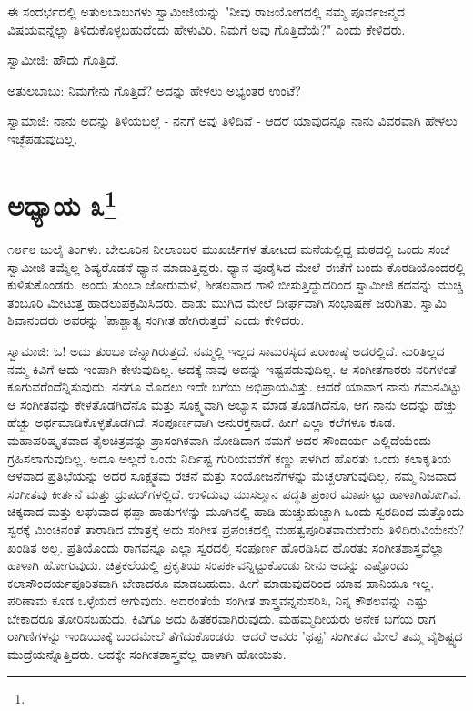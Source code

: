 ಈ ಸಂದರ್ಭದಲ್ಲಿ ಅತುಲಬಾಬುಗಳು ಸ್ವಾಮೀಜಿಯನ್ನು "ನೀವು ರಾಜಯೋಗದಲ್ಲಿ ನಮ್ಮ ಪೂರ್ವಜನ್ಮದ ವಿಷಯವನ್ನೆಲ್ಲಾ ತಿಳಿದುಕೊಳ್ಳಬಹುದೆಂದು ಹೇಳುವಿರಿ. ನಿಮಗೆ ಅವು ಗೊತ್ತಿದೆಯೆ?" ಎಂದು ಕೇಳಿದರು.

ಸ್ವಾಮೀಜಿ: ಹೌದು ಗೊತ್ತಿದೆ.

ಅತುಲಬಾಬು: ನಿಮಗೇನು ಗೊತ್ತಿದೆ? ಅದನ್ನು ಹೇಳಲು ಅಭ್ಯಂತರ ಉಂಟೆ?

ಸ್ವಾಮಾಜಿ: ನಾನು ಅದನ್ನು ತಿಳಿಯಬಲ್ಲೆ - ನನಗೆ ಅವು ತಿಳಿದಿವೆ - ಆದರೆ ಯಾವುದನ್ನೂ ನಾನು ವಿವರವಾಗಿ ಹೇಳಲು ಇಚ್ಛೆಪಡುವುದಿಲ್ಲ.

\newpage

\chapter[ಅಧ್ಯಾಯ ೩]{ಅಧ್ಯಾಯ ೩\protect\footnote{}}

೧೮೯೮ ಜುಲೈ ತಿಂಗಳು. ಬೇಲೂರಿನ ನೀಲಾಂಬರ ಮುಖರ್ಜಿಗಳ ತೋಟದ ಮನೆಯಲ್ಲಿದ್ದ ಮಠದಲ್ಲಿ ಒಂದು ಸಂಜೆ ಸ್ವಾಮೀಜಿ ತಮ್ಮೆಲ್ಲ ಶಿಷ್ಯರೊಡನೆ ಧ್ಯಾನ ಮಾಡುತ್ತಿದ್ದರು. ಧ್ಯಾನ ಪೂರೈಸಿದ ಮೇಲೆ ಈಚೆಗೆ ಬಂದು ಕೊಠಡಿಯೊಂದರಲ್ಲಿ ಕುಳಿತುಕೊಂಡರು. ಅಂದು ತುಂಬಾ ಜೋರುಮಳೆ, ಶೀತಲವಾದ ಗಾಳಿ ಬೀಸುತ್ತಿದ್ದುದರಿಂದ ಸ್ವಾಮೀಜಿ ಕದವನ್ನು ಮುಚ್ಚಿ ತಂಬೂರಿ ಮೀಟುತ್ತ ಹಾಡಲುಪಕ್ರಮಿಸಿದರು. ಹಾಡು ಮುಗಿದ ಮೇಲೆ ದೀರ್ಘವಾಗಿ ಸಂಭಾಷಣೆ ಜರುಗಿತು. ಸ್ವಾಮಿ ಶಿವಾನಂದರು ಅವರನ್ನು 'ಪಾಶ್ಚಾತ್ಯ ಸಂಗೀತ ಹೇಗಿರುತ್ತದೆ' ಎಂದು ಕೇಳಿದರು.

ಸ್ವಾಮಾಜಿ: ಓ! ಅದು ತುಂಬಾ ಚೆನ್ನಾಗಿರುತ್ತದೆ. ನಮ್ಮಲ್ಲಿ ಇಲ್ಲದ ಸಾಮರಸ್ಯದ ಪರಾಕಾಷ್ಠೆ ಅದರಲ್ಲಿದೆ. ನುರಿತಿಲ್ಲದ ನಮ್ಮ ಕಿವಿಗೆ ಅದು ಇಂಪಾಗಿ ಕೇಳುವುದಿಲ್ಲ. ಅದಕ್ಕೆ ನಾವು ಅದನ್ನು ಇಷ್ಟಪಡುವುದಿಲ್ಲ. ಆ ಸಂಗೀತಗಾರರು ನರಿಗಳಂತೆ ಕೂಗುವರೆಂದೆನ್ನಿಸುವುದು. ನನಗೂ ಮೊದಲು ಇದೇ ಬಗೆಯ ಅಭಿಪ್ರಾಯವಿತ್ತು. ಆದರೆ ಯಾವಾಗ ನಾನು ಗಮನವಿಟ್ಟು ಆ ಸಂಗೀತವನ್ನು ಕೇಳತೊಡಗಿದೆನೊ ಮತ್ತು ಸೂಕ್ಷ್ಮವಾಗಿ ಅಭ್ಯಾಸ ಮಾಡ ತೊಡಗಿದೆನೊ, ಆಗ ನಾನು ಅದನ್ನು ಹೆಚ್ಚು ಹೆಚ್ಚು ಅರ್ಥಮಾಡಿಕೊಳ್ಳತೊಡಗಿದೆ. ಸಂಪೂರ್ಣವಾಗಿ ಅನುರಕ್ತನಾದೆ. ಹೀಗೆ ಎಲ್ಲಾ ಕಲೆಗಳೂ ಕೂಡ. ಮಹಾಪರಿಷ್ಕೃತವಾದ ತೈಲಚಿತ್ರವನ್ನು ಪ್ರಾಸಂಗಿಕವಾಗಿ ನೋಡಿದಾಗ ನಮಗೆ ಅದರ ಸೌಂದರ್ಯ ಎಲ್ಲಿದೆಯೆಂದು ಗ್ರಹಿಸಲಾಗುವುದಿಲ್ಲ. ಅದೂ ಅಲ್ಲದೆ ಒಂದು ನಿರ್ದಿಷ್ಟ ಗುರಿಯವರೆಗೆ ಕಣ್ಣು ಪಳಗಿದ ಹೊರತು ಒಂದು ಕಲಾಕೃತಿಯ ಆಳವಾದ ಪ್ರತಿಭೆಯನ್ನು ಅದರ ಸೂಕ್ಷ್ಮತಮ ರಚನೆ ಮತ್ತು ಸಂಯೋಜನೆಗಳನ್ನು ಮೆಚ್ಚಲಾಗುವುದಿಲ್ಲ. ನಮ್ಮ ನಿಜವಾದ ಸಂಗೀತವು ಕೀರ್ತನೆ ಮತ್ತು ಧ್ರುಪದ್‌ಗಳಲ್ಲಿದೆ. ಉಳಿದುವು ಮುಸಲ್ಮಾನ ಪದ್ಧತಿ ಪ್ರಕಾರ ಮಾರ್ಪಟ್ಟು ಹಾಳಾಗಿಹೋಗಿವೆ. ಚಿಕ್ಕದಾದ ಮತ್ತು ಲಘುವಾದ ಥಪ್ಪಾ ಹಾಡುಗಳನ್ನು ಮೂಗಿನಲ್ಲಿ ಹಾಡಿ ಹುಚ್ಚುಹುಚ್ಚಾಗಿ ಒಂದು ಸ್ವರದಿಂದ ಮತ್ತೊಂದು ಸ್ವರಕ್ಕೆ ಮಿಂಚಿನಂತೆ ತಾರಾಡಿದ ಮಾತ್ರಕ್ಕೆ ಅದು ಸಂಗೀತ ಪ್ರಪಂಚದಲ್ಲಿ ಮಹತ್ವಪೂರಿತವಾದುದೆಂದು ತಿಳಿದಿರುವಿಯೇನು? ಖಂಡಿತ ಅಲ್ಲ. ಪ್ರತಿಯೊಂದು ರಾಗವನ್ನೂ ಎಲ್ಲಾ ಸ್ವರದಲ್ಲಿ ಸಂಪೂರ್ಣ ಹೊರಡಿಸಿದ ಹೊರತು ಸಂಗೀತಶಾಸ್ತ್ರವೆಲ್ಲಾ ಹಾಳಾಗಿ ಹೋಗುವುದು. ಚಿತ್ರಕಲೆಯಲ್ಲಿ ಪ್ರಕೃತಿಯ ಸಂಪರ್ಕವನ್ನಿಟ್ಟುಕೊಂಡು ನೀನು ಅದನ್ನು ಎಷ್ಟೊಂದು ಕಲಾಸೌಂದರ್ಯಪೂರಿತವಾಗಿ ಬೇಕಾದರೂ ಮಾಡಬಹುದು. ಹೀಗೆ ಮಾಡುವುದರಿಂದ ಯಾವ ಹಾನಿಯೂ ಇಲ್ಲ. ಪರಿಣಾಮ ಕೂಡ ಒಳ್ಳೆಯದೆ ಆಗುವುದು. ಅದರಂತೆಯೆ ಸಂಗೀತ ಶಾಸ್ತ್ರವನ್ನನುಸರಿಸಿ, ನಿನ್ನ ಕೌಶಲವನ್ನು ಎಷ್ಟು ಬೇಕಾದರೂ ತೋರಿಸಬಹುದು. ಕಿವಿಗೂ ಅದು ಹಿತಕರವಾಗಿರುವುದು. ಮಹಮ್ಮದೀಯರು ಅನೇಕ ಬಗೆಯ ರಾಗ ರಾಗಿಣಿಗಳನ್ನು ಇಂಡಿಯಾಕ್ಕೆ ಬಂದಮೇಲೆ ತೆಗೆದುಕೊಂಡರು. ಆದರೆ ಅವರು 'ಥಪ್ಪ' ಸಂಗೀತದ ಮೇಲೆ ತಮ್ಮ ವೈಶಿಷ್ಟ್ಯದ ಮುದ್ರೆಯನ್ನೊತ್ತಿದರು. ಅದಕ್ಕೇ ಸಂಗೀತಶಾಸ್ತ್ರವೆಲ್ಲ ಹಾಳಾಗಿ ಹೋಯಿತು.

